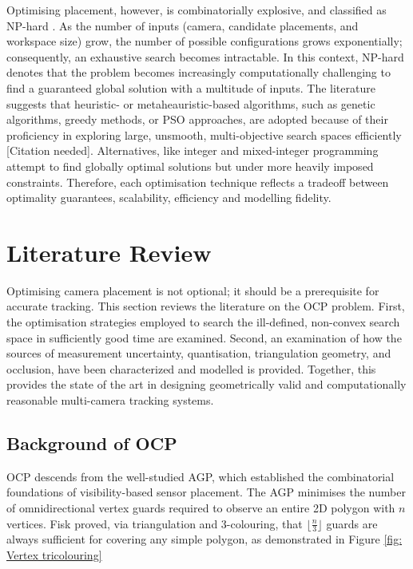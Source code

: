 Optimising placement, however, is combinatorially explosive, and classified as \gls{NP-hard} \parencite{kirchhofOptimalPlacementMultiple2013}. As the number of inputs (camera, candidate placements, and workspace size) grow, the number of possible configurations grows exponentially; consequently, an exhaustive search becomes intractable.  In this context, \gls{NP-hard} denotes that the problem becomes increasingly computationally challenging to find a guaranteed global solution with a multitude of inputs. The literature suggests that heuristic- or metaheauristic-based algorithms, such as genetic algorithms, greedy methods, or \gls{PSO} approaches, are adopted because of their proficiency in exploring large, unsmooth, multi-objective search spaces efficiently [Citation needed]. Alternatives, like integer and mixed-integer programming attempt to find globally optimal solutions but under more heavily imposed constraints. Therefore, each optimisation technique reflects a tradeoff between optimality guarantees, scalability, efficiency and modelling fidelity.

\section{Literature Review}   
Optimising camera placement is not optional; it should be a prerequisite for accurate tracking. This section reviews the literature on the \gls{OCP} problem. First, the optimisation strategies employed to search the ill-defined, non-convex search space in sufficiently good time are examined. Second, an examination of how the sources of measurement uncertainty, quantisation, triangulation geometry,  and occlusion, have been characterized and modelled is provided.  Together, this provides the state of the art in designing geometrically valid and computationally reasonable multi-camera tracking systems.

\subsection{Background of OCP}
\gls{OCP} descends from the well-studied \gls{AGP}, which established the combinatorial foundations of visibility-based sensor placement. The \gls{AGP} minimises the number of omnidirectional vertex guards required to observe an entire 2D polygon with $n$ vertices. Fisk proved, via triangulation and 3-colouring, that $\lfloor\frac{n}{3}\rfloor$ guards are always sufficient for covering any simple polygon, as demonstrated in Figure \ref{fig: Vertex tricolouring} %

